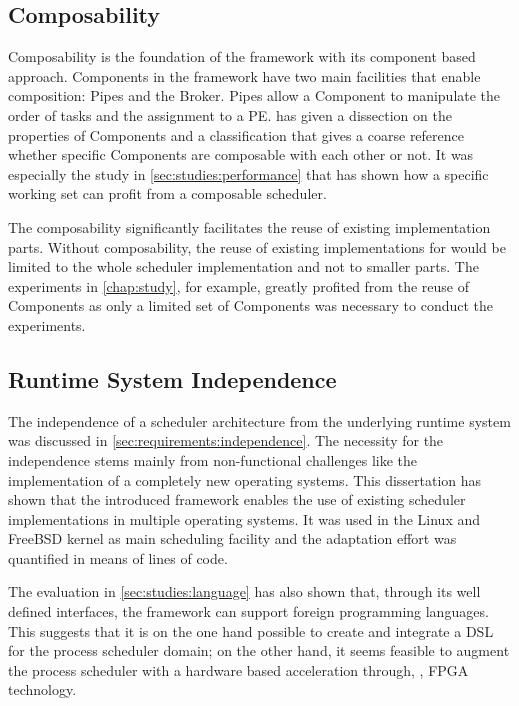 \subsection{Composability}

Composability is the foundation of the \cobas{} framework with its component based approach. Components in the \cobas{} framework have two main facilities that enable composition: Pipes and the Broker. Pipes allow a \cobas{} Component to manipulate the order of tasks and the assignment to a \ac{PE}.  has given a dissection on the properties of Components and a classification that gives a coarse reference whether specific Components are composable with each other or not. It was especially the study in \cref{sec:studies:performance} that has shown how a specific working set can profit from a composable scheduler.

The composability significantly facilitates the reuse of existing implementation parts. Without composability, the reuse of existing implementations for \cobas{} would be limited to the whole scheduler implementation and not to smaller parts. The experiments in \cref{chap:study}, for example, greatly profited from the reuse of Components as only a limited set of Components was necessary to conduct the experiments.

\subsection{Runtime System Independence}

The independence of a scheduler architecture from the underlying runtime system was discussed in \cref{sec:requirements:independence}. The necessity for the independence stems mainly from non-functional challenges like the implementation of a completely new operating systems. This dissertation has shown that the introduced framework enables the use of existing scheduler implementations in multiple operating systems. It was used in the Linux and FreeBSD kernel as main scheduling facility and the adaptation effort was quantified in means of lines of code.

The evaluation in \cref{sec:studies:language} has also shown that, through its well defined interfaces, the \cobas{} framework can support foreign programming languages. This suggests that it is on the one hand possible to create and integrate a \ac{DSL} for the process scheduler domain; on the other hand, it seems feasible to augment the process scheduler with a hardware based acceleration through, \eg{}, \ac{FPGA} technology.


